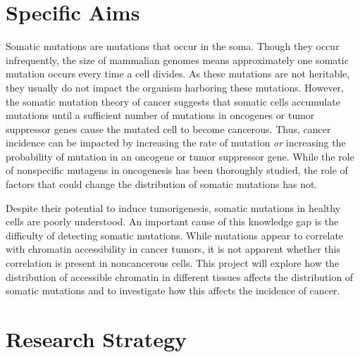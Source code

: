 \documentclass[12pt]{article}
\begin{document}
\section{Specific Aims} %

Somatic mutations are mutations that occur in the soma.
Though they occur infrequently, the size of mammalian genomes means approximately one somatic mutation occurs every time a cell divides.
As these mutations are not heritable, they usually do not impact the organism harboring these mutations.
However, the somatic mutation theory of cancer suggests that somatic cells accumulate mutations until a sufficient number of mutations in oncogenes or tumor suppressor genes cause the mutated cell to become cancerous.
Thus, cancer incidence can be impacted by increasing the rate of mutation \textit{or} increasing the probability of mutation in an oncogene or tumor suppressor gene.
While the role of nonspecific mutagens in oncogenesis has been thoroughly studied, the role of factors that could change the distribution of somatic mutations has not.






Despite their potential to induce tumorigenesis, somatic mutations in healthy cells are poorly understood.
An important cause of this knowledge gap is the difficulty of detecting somatic mutations.
While mutations appear to correlate with chromatin accessibility in cancer tumors, it is not apparent whether this correlation is present in noncancerous cells.
This project will explore how the distribution of accessible chromatin in different tissues affects the distribution of somatic mutations and to investigate how this affects the incidence of cancer.



\section{Research Strategy} %
\end{document}
